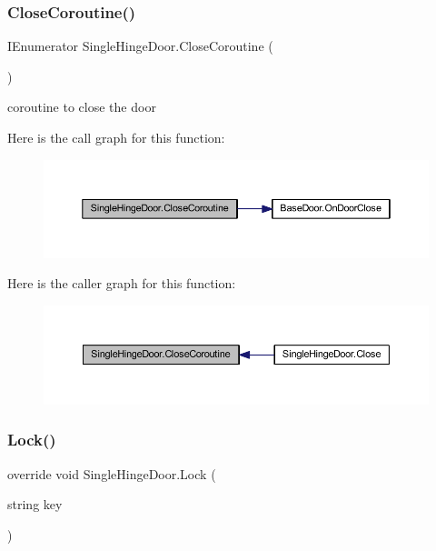 \subsubsection{\texorpdfstring{Close\+Coroutine()}{CloseCoroutine()}}
{\footnotesize\ttfamily I\+Enumerator Single\+Hinge\+Door.\+Close\+Coroutine (\begin{DoxyParamCaption}{ }\end{DoxyParamCaption})\hspace{0.3cm}{\ttfamily [private]}}



coroutine to close the door 

Here is the call graph for this function\+:\nopagebreak
\begin{figure}[H]
\begin{center}
\leavevmode
\includegraphics[width=350pt]{class_single_hinge_door_a6b1760cbc6ac5ed4c0e9d7ecb10d2606_cgraph}
\end{center}
\end{figure}
Here is the caller graph for this function\+:\nopagebreak
\begin{figure}[H]
\begin{center}
\leavevmode
\includegraphics[width=350pt]{class_single_hinge_door_a6b1760cbc6ac5ed4c0e9d7ecb10d2606_icgraph}
\end{center}
\end{figure}
\mbox{\label{class_single_hinge_door_a329ff33388675ec531996bdb33dd0c70}} 
\subsubsection{\texorpdfstring{Lock()}{Lock()}}
{\footnotesize\ttfamily override void Single\+Hinge\+Door.\+Lock (\begin{DoxyParamCaption}\item[{string}]{key }\end{DoxyParamCaption})\hspace{0.3cm}{\ttfamily [virtual]}}




